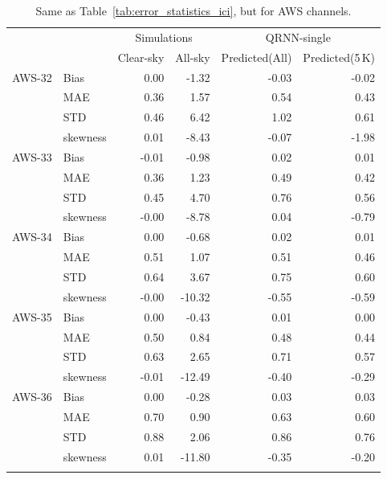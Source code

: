 \documentclass[amt, manuscript]{copernicus}
\begin{document}
\begin{table}[t]
	\caption{Same as Table~\ref{tab:error_statistics_ici}, but for AWS channels. }
	\label{tab:statistics_qrnn_aws}
	\begin{tabular}{llrr|rr}
		\tophline
		&&\multicolumn{2}{c|}{Simulations}& \multicolumn{2}{c}{QRNN-single} \\
		\cline{3-6}
		&&   Clear-sky &   All-sky &   Predicted(All) & Predicted(5\,K) \\
		\middlehline
		AWS-32  &Bias     & 0.00 & -1.32 &  -0.03 & -0.02 \\
		&MAE      & 0.36 &  1.57 &   0.54 &  0.43 \\
		&STD      & 0.46 &  6.42 &   1.02 &  0.61 \\
		&skewness & 0.01 & -8.43 &  -0.07 & -1.98 \\
		\middlehline
		AWS-33	&Bias     & -0.01 & -0.98 &  0.02 &  0.01 \\
		&MAE      &  0.36 &  1.23 &  0.49 &  0.42 \\
		&STD      &  0.45 &  4.70 &  0.76 &  0.56 \\
		&skewness & -0.00 & -8.78 &  0.04 & -0.79 \\
		
		\middlehline
		AWS-34	&Bias     &  0.00 &  -0.68 &  0.02 &  0.01 \\
		&MAE      &  0.51 &   1.07 &  0.51 &  0.46 \\
		&STD      &  0.64 &   3.67 &  0.75 &  0.60 \\
		&skewness & -0.00 & -10.32 & -0.55 & -0.59 \\
		\middlehline
		AWS-35	&Bias     &  0.00 &  -0.43 &  0.01 &  0.00 \\
		&MAE      &  0.50 &   0.84 &  0.48 &  0.44 \\
		&STD      &  0.63 &   2.65 &  0.71 &  0.57 \\
		&skewness & -0.01 & -12.49 & -0.40 & -0.29 \\
		\middlehline
		AWS-36  &Bias     & 0.00 &  -0.28 &   0.03  &  0.03 \\
		&MAE      & 0.70 &   0.90 &   0.63  &  0.60 \\
		&STD      & 0.88 &   2.06 &   0.86  &  0.76 \\
		&skewness & 0.01 & -11.80 &  -0.35  & -0.20 \\
		\bottomhline				
	\end{tabular}
	\belowtable{} %
\end{table}
\end{document}
